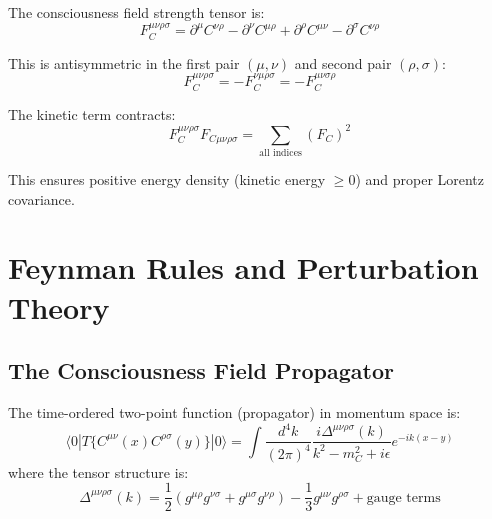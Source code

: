 \begin{level3}
The consciousness field strength tensor is:
\begin{equation}
F^{\mu\nu\rho\sigma}_C = \partial^\mu C^{\nu\rho} - \partial^\nu C^{\mu\rho} + \partial^\rho C^{\mu\nu} - \partial^\sigma C^{\nu\rho}
\end{equation}

This is antisymmetric in the first pair $(\mu, \nu)$ and second pair $(\rho, \sigma)$:
\begin{equation}
F^{\mu\nu\rho\sigma}_C = -F^{\nu\mu\rho\sigma}_C = -F^{\mu\nu\sigma\rho}_C
\end{equation}

The kinetic term contracts:
\begin{equation}
F^{\mu\nu\rho\sigma}_C F_{C\mu\nu\rho\sigma} = \sum_{\text{all indices}} (F_{C})^2
\end{equation}

This ensures positive energy density (kinetic energy $\geq 0$) and proper Lorentz covariance.
\end{level3}

\section{Feynman Rules and Perturbation Theory}

\subsection{The Consciousness Field Propagator}

\begin{thm}\label{thm:consciousness-propagator}
The time-ordered two-point function (propagator) in momentum space is:
\begin{equation}
\boxed{\langle 0|T\{C^{\mu\nu}(x)C^{\rho\sigma}(y)\}|0\rangle = \int \frac{d^4k}{(2\pi)^4} \frac{i\Delta^{\mu\nu\rho\sigma}(k)}{k^2 - m_C^2 + i\epsilon} e^{-ik(x-y)}}
\end{equation}
where the tensor structure is:
\begin{equation}
\Delta^{\mu\nu\rho\sigma}(k) = \frac{1}{2}(g^{\mu\rho}g^{\nu\sigma} + g^{\mu\sigma}g^{\nu\rho}) - \frac{1}{3}g^{\mu\nu}g^{\rho\sigma} + \text{gauge terms}
\end{equation}
\end{thm}

